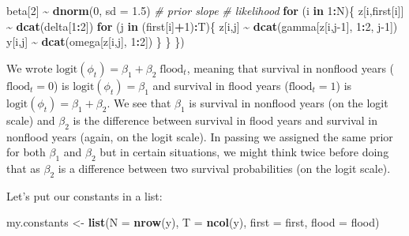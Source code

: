 \documentclass[
  12pt,
]{krantz}
\newenvironment{Shaded}{\begin{snugshade}}{\end{snugshade}}
\newcommand{\AttributeTok}[1]{\textcolor[rgb]{0.13,0.29,0.53}{#1}}
\newcommand{\CommentTok}[1]{\textcolor[rgb]{0.56,0.35,0.01}{\textit{#1}}}
\newcommand{\ControlFlowTok}[1]{\textcolor[rgb]{0.13,0.29,0.53}{\textbf{#1}}}
\newcommand{\DecValTok}[1]{\textcolor[rgb]{0.00,0.00,0.81}{#1}}
\newcommand{\FloatTok}[1]{\textcolor[rgb]{0.00,0.00,0.81}{#1}}
\newcommand{\FunctionTok}[1]{\textcolor[rgb]{0.13,0.29,0.53}{\textbf{#1}}}
\newcommand{\NormalTok}[1]{#1}
\newcommand{\OtherTok}[1]{\textcolor[rgb]{0.56,0.35,0.01}{#1}}
\newcommand{\SpecialCharTok}[1]{\textcolor[rgb]{0.81,0.36,0.00}{\textbf{#1}}}
\begin{document}
\begin{Shaded}
\begin{Highlighting}[]
\NormalTok{  beta[}\DecValTok{2}\NormalTok{] }\SpecialCharTok{\textasciitilde{}} \FunctionTok{dnorm}\NormalTok{(}\DecValTok{0}\NormalTok{, }\AttributeTok{sd =} \FloatTok{1.5}\NormalTok{)  }\CommentTok{\# prior slope}
  \CommentTok{\# likelihood}
  \ControlFlowTok{for}\NormalTok{ (i }\ControlFlowTok{in} \DecValTok{1}\SpecialCharTok{:}\NormalTok{N)\{}
\NormalTok{    z[i,first[i]] }\SpecialCharTok{\textasciitilde{}} \FunctionTok{dcat}\NormalTok{(delta[}\DecValTok{1}\SpecialCharTok{:}\DecValTok{2}\NormalTok{])}
    \ControlFlowTok{for}\NormalTok{ (j }\ControlFlowTok{in}\NormalTok{ (first[i]}\SpecialCharTok{+}\DecValTok{1}\NormalTok{)}\SpecialCharTok{:}\NormalTok{T)\{}
\NormalTok{      z[i,j] }\SpecialCharTok{\textasciitilde{}} \FunctionTok{dcat}\NormalTok{(gamma[z[i,j}\DecValTok{{-}1}\NormalTok{], }\DecValTok{1}\SpecialCharTok{:}\DecValTok{2}\NormalTok{, j}\DecValTok{{-}1}\NormalTok{])}
\NormalTok{      y[i,j] }\SpecialCharTok{\textasciitilde{}} \FunctionTok{dcat}\NormalTok{(omega[z[i,j], }\DecValTok{1}\SpecialCharTok{:}\DecValTok{2}\NormalTok{])}
\NormalTok{    \}}
\NormalTok{  \}}
\NormalTok{\})}
\end{Highlighting}
\end{Shaded}

We wrote \(\text{logit}(\phi_t) = \beta_1 + \beta_2 \; \text{flood}_t\), meaning that survival in nonflood years (\(\text{flood}_t = 0\)) is \(\text{logit}(\phi_t) = \beta_1\) and survival in flood years (\(\text{flood}_t = 1\)) is \(\text{logit}(\phi_t) = \beta_1 + \beta_2\). We see that \(\beta_1\) is survival in nonflood years (on the logit scale) and \(\beta_2\) is the difference between survival in flood years and survival in nonflood years (again, on the logit scale). In passing we assigned the same prior for both \(\beta_1\) and \(\beta_2\) but in certain situations, we might think twice before doing that as \(\beta_2\) is a difference between two survival probabilities (on the logit scale).

Let's put our constants in a list:

\begin{Shaded}
\begin{Highlighting}[]
\NormalTok{my.constants }\OtherTok{\textless{}{-}} \FunctionTok{list}\NormalTok{(}\AttributeTok{N =} \FunctionTok{nrow}\NormalTok{(y),}
                     \AttributeTok{T =} \FunctionTok{ncol}\NormalTok{(y),}
                     \AttributeTok{first =}\NormalTok{ first,}
                     \AttributeTok{flood =}\NormalTok{ flood)}
\end{Highlighting}
\end{Shaded}
\end{document}
